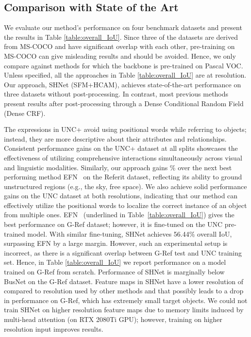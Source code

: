 \documentclass[11pt]{article}
\begin{document}
\subsection{Comparison with State of the Art}
We evaluate our method's performance on four benchmark datasets and present the results in Table \ref{table:overall_IoU}. Since three of the datasets are derived from MS-COCO and have significant overlap with each other, pre-training on MS-COCO can give misleading results and should be avoided. Hence, we only compare against methods for which the backbone is pre-trained on Pascal VOC. Unless specified, all the approaches in Table \ref{table:overall_IoU} are at  resolution. Our approach, SHNet (SFM+HCAM), achieves state-of-the-art performance on three datasets without post-processing. In contrast, most previous methods present results after post-processing through a Dense Conditional Random Field (Dense CRF).






The expressions in UNC+ avoid using positional words while referring to objects; instead, they are more descriptive about their attributes and relationships. Consistent performance gains on the UNC+ dataset at all splits showcases the effectiveness of utilizing comprehensive interactions simultaneously across visual and linguistic modalities. Similarly, our approach gains \% over the next best performing method EFN~\cite{Feng_2021_CVPR} on the Referit dataset, reflecting its ability to ground unstructured regions (e.g., the sky, free space). We also achieve solid performance gains on the UNC dataset at both resolutions, indicating that our method can effectively utilize the positional words to localize the correct instance of an object from multiple ones. 
EFN~\cite{Feng_2021_CVPR} (underlined in Table~\ref{table:overall_IoU}) gives the best performance on G-Ref dataset; however, it is fine-tuned on the UNC pre-trained model. With similar fine-tuning, SHNet achieves 56.44\% overall IoU, surpassing EFN by a large margin. However, such an experimental setup is incorrect, as there is a significant overlap between G-Ref test and UNC training set. Hence, in Table \ref{table:overall_IoU} we report performance on a model trained on G-Ref from scratch. Performance of SHNet is marginally below BusNet on the G-Ref dataset. Feature maps in SHNet have a lower resolution of  compared to  resolution used by other methods and that possibly leads to a drop in performance on G-Ref, which has extremely small target objects. We could not train SHNet on higher resolution feature maps due to memory limits induced by multi-head attention (on RTX 2080Ti GPU); however, training on higher resolution input improves results. 
\end{document}

